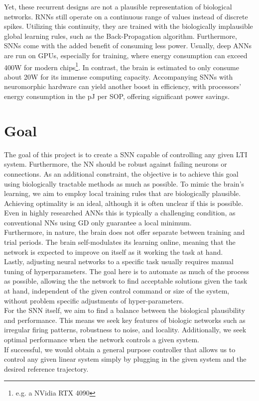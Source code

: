Yet, these recurrent designs are not a plausible representation of biological networks. \acp{RNN} still operate on a continuous range of values instead of discrete spikes. Utilizing this continuity, they are trained with the biologically implausible global learning rules, such as the Back-Propagation algorithm. Furthermore, \acp{SNN} come with the added benefit of consuming less power. Usually, deep \acp{ANN} are run on \acp{GPU}, especially for training, where energy consumption can exceed 400W for modern chips\footnote{e.g. a NVidia RTX 4090}. In contrast, the brain is estimated to only consume about
20W \cite{clarke_circulation_1999} for its immense computing capacity. Accompanying \acp{SNN} with neuromorphic hardware can yield another boost in efficiency, with processors' energy consumption in the pJ per \ac{SOP}\cite{indiveri_importance_2019}, offering significant power savings.


\section{Goal}\label{sec:goal}
The goal of this project is to create a \ac{SNN} capable of controlling any given \ac{LTI} system. Furthermore, the \ac{NN} should be robust against failing neurons or connections. As an additional constraint, the objective is to achieve this goal using biologically tractable methods as much as possible.
To mimic the brain's learning, we aim to employ local training rules that are biologically plausible.\\
Achieving optimality is an ideal, although it is often unclear if this is possible. Even in highly researched \acp{ANN} this is typically a challenging condition, as conventional \acp{NN} using \ac{GD} only guarantee a local minimum.\\
Furthermore, in nature, the brain does not offer separate between training and trial periods. The brain self-modulates its learning online, meaning that the network is expected to improve on itself as it working the task at hand.\\
Lastly, adjusting neural networks to a specific task usually requires manual tuning of hyperparameters. The goal here is to automate as much of the process as possible, allowing the the network to find acceptable solutions given the task at hand, independent of the given control command or size of the system, without problem specific adjustments of hyper-parameters.\\
For the \ac{SNN} itself, we aim to find a balance between the biological plausibility and performance. This means we seek key features of biologic networks such as irregular firing patterns, robustness to noise, and locality. Additionally, we seek optimal performance when the network controls a given system.\\
If successful, we would obtain a general purpose controller that allows us to control any given linear system simply by plugging in the given system and the desired reference trajectory.\\


